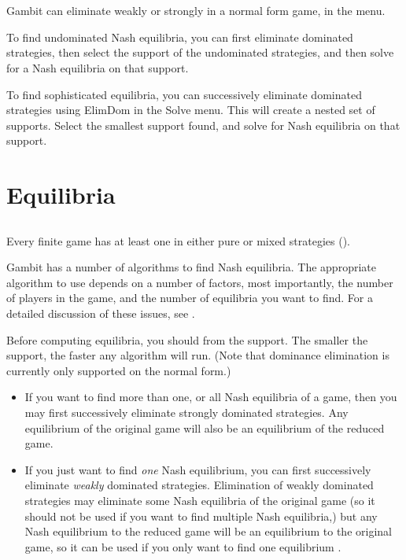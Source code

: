 \section{}\label{domsec}

Gambit can eliminate weakly or strongly 
 in a 
normal form game, in the  menu.  

To find undominated Nash equilibria, you can first eliminate dominated 
strategies, then select the support of the undominated strategies, and then 
solve for a Nash equilibria on that support.  

To find sophisticated equilibria, you can successively eliminate 
dominated strategies using ElimDom in the Solve menu.  This will 
create a nested set of supports.  
Select the smallest support found, and solve for Nash equilibria on that 
support.  

\section{Equilibria}

\subsection{}\label{nashsec}
Every finite game has at least one  in either pure or mixed strategies (\cite{Nash:1950}).  

Gambit has a number of algorithms to find Nash equilibria.  
The appropriate algorithm to use 
depends on a number of factors, most importantly, the number of players in the 
game, and the number of equilibria you want to find.  For a detailed 
discussion of these issues, see \cite{McKMcL:1996}.  

Before computing equilibria, you should 
 from 
the support.  The smaller the support, the faster any algorithm will run.  (Note that 
dominance elimination is currently only supported on the normal form.) 
\begin{itemize}
\item 
If you want to find more than one, or all Nash equilibria of a game, then you may first 
successively eliminate strongly dominated strategies.  Any equilibrium of the original 
game will also be an equilibrium of the reduced game. 
\item 
If you just want to find {\em one} Nash equilibrium, you can first successively eliminate 
{\em weakly} dominated strategies.  Elimination of weakly dominated strategies may 
eliminate some Nash equilibria of the original game (so it should not be used if you 
want to find multiple Nash equilibria,) but any Nash equilibrium to the reduced 
game will be an equilibrium to the original game, so it can be used if you only 
want to find one equilibrium .  
\end{itemize}

